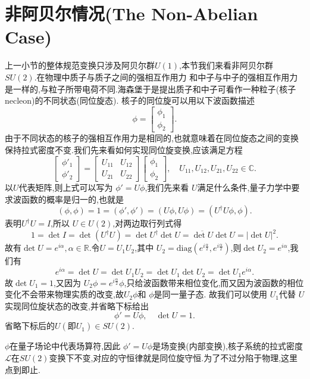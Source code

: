 \documentclass[../main.tex]{subfiles}
\begin{document}
 \section{非阿贝尔情况(The Non-Abelian Case)}
 上一小节的整体规范变换只涉及阿贝尔群$U(1)$,本节我们来看非阿贝尔群 $SU(2)$.在物理中质子与质子之间的强相互作用力
 和中子与中子的强相互作用力是一样的,与粒子所带电荷不同.海森堡于是提出质子和中子可看作一种粒子(核子necleon)的不同状态(同位旋态).
 核子的同位旋可以用以下波函数描述\[
\phi = \begin{bmatrix} \phi_1 \\ \phi_2 \end{bmatrix}  
 .\] 
 由于不同状态的核子的强相互作用力是相同的,也就意味着在同位旋态之间的变换保持拉式密度不变.我们先来看如何实现同位旋变换,应该满足方程\[
   \begin{bmatrix} \phi'_1\\\phi'_2  \end{bmatrix}  
   = \begin{bmatrix} U_{11}&U_{12}\\ U_{21}& U_{22} \end{bmatrix} 
   \begin{bmatrix} \phi_1 \\\phi_2 \end{bmatrix} 
   ,\quad U_{11},U_{12}, U_{21},U_{22} \in \mathbb{C} 
 .\] 
 以$U$代表矩阵,则上式可以写为 $\phi' = U \phi$,我们先来看 $U$满足什么条件,量子力学中要求波函数的概率是归一的,也就是 \[
   (\phi,\phi) = 1 = (\phi',\phi') = (U\phi,U\phi) = (U^\dagger U\phi,\phi) 
 .\] 
 表明$U^\dagger U = I$,所以 $U\in U(2)$,对两边取行列式得\[
   1 = \det{I}  = \det{(U^\dagger U)} = \det{U^\dagger} \det{U} = \overline{\det{U}}\det{U} =  |\det{U}|^2 
 .\] 
 故有$\det{U} = e^{i\alpha} , \alpha \in \mathbb{R}$.令$U = U_1U_2$,其中 $U_2 = \text{diag}(e^{i\frac{\alpha}{2}},e^{i \frac{\alpha}{2}})$,则$\det{U_2}=e^{i\alpha}$,我们有\[
   e^{i\alpha} = \det{U} = \det{U_1 U_2} = \det{U_1} \det{U_2} = \det{U_1}e^{i\alpha}  
 .\] 
 故$\det{U_1} = 1$,又因为 $U_2 \phi = e^{i \frac{\alpha}{2}} \phi$,只给波函数带来相位变化,而又因为波函数的相位变化不会带来物理实质的改变,故$U_2\phi$和 $\phi$是同一量子态.
 故我们可以使用 $U_1$代替 $U$实现同位旋状态的改变,并省略下标给出 \[
   \phi' = U\phi,\quad \det{U} = 1 
 .\] 
 省略下标后的$U(\text{即}U_1) \in SU(2)$.

 $\phi$在量子场论中代表场算符,因此 $\phi' = U \phi$是场变换(内部变换),核子系统的拉式密度 $\mathscr{L}$在$SU(2)$变换下不变,对应的守恒律就是同位旋守恒.为了不过分陷于物理,这里点到即止.
\end{document}
